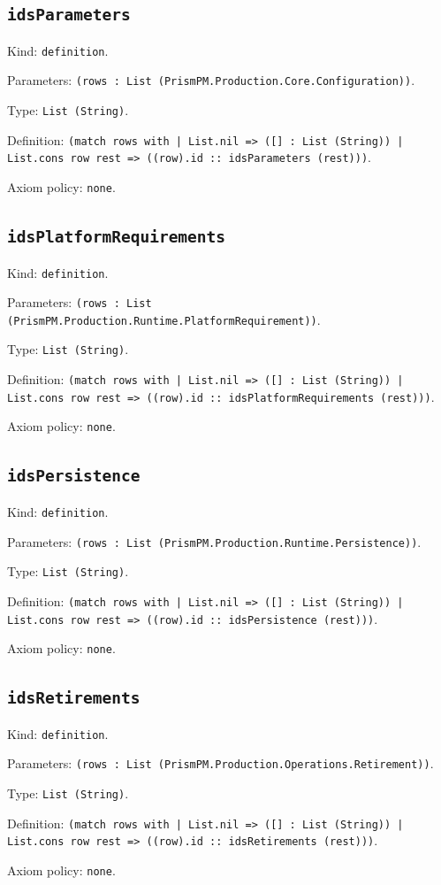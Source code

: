 \documentclass[11pt]{article}
\begin{document}
\subsection*{\texttt{idsParameters}}
\noindent Kind: \texttt{definition}.\par
\noindent Parameters: \texttt{(rows : List (PrismPM.Production.Core.Configuration))}.\par
\noindent Type: \texttt{List (String)}.\par
\noindent Definition: \texttt{(match rows with | List.nil => ([] : List (String)) | List.cons row rest => ((row).id :: idsParameters (rest)))}.\par
\noindent Axiom policy: \texttt{none}.\par
\subsection*{\texttt{idsPlatformRequirements}}
\noindent Kind: \texttt{definition}.\par
\noindent Parameters: \texttt{(rows : List (PrismPM.Production.Runtime.PlatformRequirement))}.\par
\noindent Type: \texttt{List (String)}.\par
\noindent Definition: \texttt{(match rows with | List.nil => ([] : List (String)) | List.cons row rest => ((row).id :: idsPlatformRequirements (rest)))}.\par
\noindent Axiom policy: \texttt{none}.\par
\subsection*{\texttt{idsPersistence}}
\noindent Kind: \texttt{definition}.\par
\noindent Parameters: \texttt{(rows : List (PrismPM.Production.Runtime.Persistence))}.\par
\noindent Type: \texttt{List (String)}.\par
\noindent Definition: \texttt{(match rows with | List.nil => ([] : List (String)) | List.cons row rest => ((row).id :: idsPersistence (rest)))}.\par
\noindent Axiom policy: \texttt{none}.\par
\subsection*{\texttt{idsRetirements}}
\noindent Kind: \texttt{definition}.\par
\noindent Parameters: \texttt{(rows : List (PrismPM.Production.Operations.Retirement))}.\par
\noindent Type: \texttt{List (String)}.\par
\noindent Definition: \texttt{(match rows with | List.nil => ([] : List (String)) | List.cons row rest => ((row).id :: idsRetirements (rest)))}.\par
\noindent Axiom policy: \texttt{none}.\par
\end{document}
